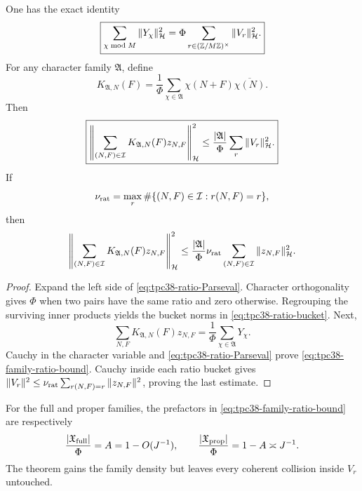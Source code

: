 \begin{theorem}
\label{thm:tpc38-ratio-Parseval}
One has the exact identity
\begin{equation}
 \boxed{
 \sum_{\chi\bmod M}\|Y_\chi\|_{\mathcal H}^2
 =\Phi\sum_{r\in(\mathbb Z/M\mathbb Z)^\times}\|V_r\|_{\mathcal H}^2.}
 \label{eq:tpc38-ratio-Parseval}
\end{equation}
For any character family \(\mathfrak A\), define
\begin{equation}
 K_{\mathfrak A,N}(F)
 =\frac1\Phi\sum_{\chi\in\mathfrak A}
 \chi(N+F)\overline{\chi(N)}.
 \label{eq:tpc38-family-kernel}
\end{equation}
Then
\begin{equation}
 \boxed{
 \left\|\sum_{(N,F)\in\mathcal I}
 K_{\mathfrak A,N}(F)z_{N,F}\right\|_{\mathcal H}^2
 \le\frac{|\mathfrak A|}{\Phi}
 \sum_r\|V_r\|_{\mathcal H}^2.}
 \label{eq:tpc38-family-ratio-bound}
\end{equation}
If
\begin{equation}
 \nu_{\rm rat}
 =\max_r\#\{(N,F)\in\mathcal I:r(N,F)=r\},
 \label{eq:tpc38-ratio-multiplicity}
\end{equation}
then
\begin{equation}
 \left\|\sum_{(N,F)\in\mathcal I}
 K_{\mathfrak A,N}(F)z_{N,F}\right\|_{\mathcal H}^2
 \le\frac{|\mathfrak A|}{\Phi}\nu_{\rm rat}
 \sum_{(N,F)\in\mathcal I}\|z_{N,F}\|_{\mathcal H}^2.
 \label{eq:tpc38-family-multiplicity-bound}
\end{equation}
\end{theorem}

\begin{proof}
Expand the left side of \eqref{eq:tpc38-ratio-Parseval}.  Character
orthogonality gives \(\Phi\) when two pairs have the same ratio and zero
otherwise.  Regrouping the surviving inner products yields the bucket
norms in \eqref{eq:tpc38-ratio-bucket}.  Next,
\[
 \sum_{N,F}K_{\mathfrak A,N}(F)z_{N,F}
 =\frac1\Phi\sum_{\chi\in\mathfrak A}Y_\chi.
\]
Cauchy in the character variable and
\eqref{eq:tpc38-ratio-Parseval} prove
\eqref{eq:tpc38-family-ratio-bound}.  Cauchy inside each ratio bucket gives
\(\|V_r\|^2\le\nu_{\rm rat}\sum_{r(N,F)=r}\|z_{N,F}\|^2\), proving the
last estimate.
\end{proof}

For the full and proper families, the prefactors in
\eqref{eq:tpc38-family-ratio-bound} are respectively
\begin{equation}
 \frac{|\mathfrak X_{\rm full}|}{\Phi}=A=1-O(J^{-1}),
 \qquad
 \frac{|\mathfrak X_{\rm prop}|}{\Phi}=1-A\asymp J^{-1}.
 \label{eq:tpc38-family-density-factors}
\end{equation}
The theorem gains the family density but leaves every coherent collision
inside \(V_r\) untouched.

